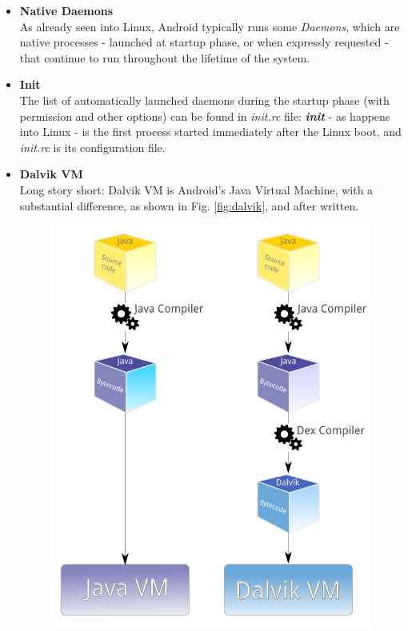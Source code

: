 \begin{itemize}
\item \textbf{Native Daemons}\\
As already seen into Linux, Android typically runs some \textit{Daemons}, which are native processes - launched at startup phase, or when expressly requested - that continue to run throughout the lifetime of the system.
\item \textbf{Init}\\
The list of automatically launched daemons during the startup phase (with permission and other options) can be found in \textit{init.rc} file: \textit{\textbf{init}} - as happens into Linux - is the first process started immediately after the Linux boot, and \textit{init.rc} is its configuration file.
\item \textbf{Dalvik VM}\\
Long story short: Dalvik VM is Android's Java Virtual Machine, with a substantial difference, as shown in Fig. \ref{fig:dalvik}, and after written.\\
\begin{figure}[!htb]
	\centering
	\includegraphics[scale=.7]{images/dalvik.pdf}

\end{figure}
\end{itemize}
